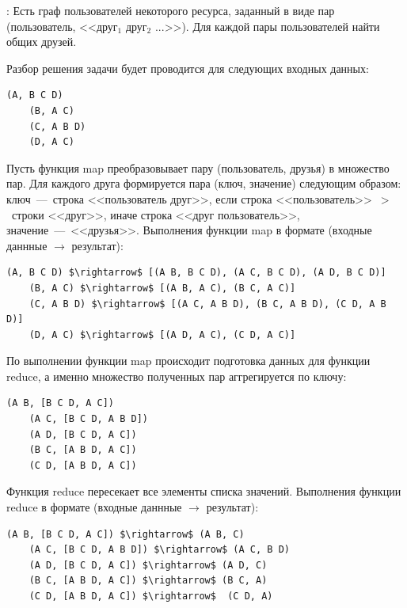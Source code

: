 \documentclass[12pt,a4paper,oneside]{extarticle}
\begin{document}
            {:} Есть граф пользователей некоторого ресурса, заданный в виде пар (пользователь, <<друг$_1$ друг$_2$ ...>>). Для каждой пары пользователей найти общих друзей.

            Разбор решения задачи будет проводится для следующих входных данных: 
            \lstset{} %
            \begin{lstlisting}[mathescape] 
    (A, B C D)
    (B, A C)
    (C, A B D)
    (D, A C)
            \end{lstlisting}

            Пусть функция map преобразовывает пару (пользователь, друзья) в множество пар.
            Для каждого друга формируется пара (ключ, значение) следующим образом: ключ~---~строка <<пользователь друг>>, если строка <<пользователь>>~$>$~строки <<друг>>, иначе строка <<друг пользователь>>, значение~---~<<друзья>>. Выполнения функции map в формате (входные даннные $\rightarrow$ результат):

            \lstset{}
            \begin{lstlisting}[mathescape] 
    (A, B C D) $\rightarrow$ [(A B, B C D), (A C, B C D), (A D, B C D)]
    (B, A C) $\rightarrow$ [(A B, A C), (B C, A C)]
    (C, A B D) $\rightarrow$ [(A C, A B D), (B C, A B D), (C D, A B D)]
    (D, A C) $\rightarrow$ [(A D, A C), (C D, A C)]
            \end{lstlisting}
                
            По выполнении функции map происходит подготовка данных для функции reduce, а именно множество полученных пар аггрегируется по ключу:

            \lstset{}
            \begin{lstlisting}[mathescape] 
    (A B, [B C D, A C])
    (A C, [B C D, A B D])
    (A D, [B C D, A C])
    (B C, [A B D, A C])
    (C D, [A B D, A C])
            \end{lstlisting}

            Функция reduce пересекает все элементы списка значений. Выполнения функции reduce в формате (входные даннные $\rightarrow$ результат):

            \lstset{}
            \begin{lstlisting}[mathescape] 
    (A B, [B C D, A C]) $\rightarrow$ (A B, C)
    (A C, [B C D, A B D]) $\rightarrow$ (A C, B D)
    (A D, [B C D, A C]) $\rightarrow$ (A D, C)
    (B C, [A B D, A C]) $\rightarrow$ (B C, A)
    (C D, [A B D, A C]) $\rightarrow$  (C D, A)
            \end{lstlisting}
\end{document}
